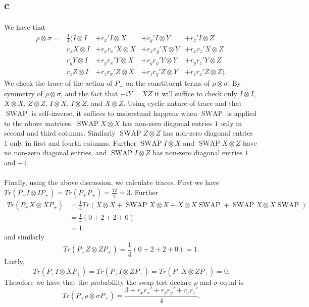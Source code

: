\documentclass[letterpaper,12pt,oneside,onecolumn]{article}
\DeclareMathOperator{\swap}{SWAP}
\begin{document}
\subsection{c}
\paragraph{}
We have that
\begin{align*}
\rho\otimes\sigma = &\frac{1}{4}(I \otimes I &+ r_x' I \otimes X &+ r_y' I \otimes Y &+ r_z' I \otimes Z \\
&r_x X\otimes I &+ r_xr_x' X\otimes X &+ r_xr_y' X\otimes Y &+ r_xr_z' X \otimes Z \\
&r_y Y \otimes I &+ r_yr_x'Y\otimes X &+ r_yr_y' Y \otimes Y &+ r_yr_z' Y \otimes Z \\
&r_z Z\otimes I &+ r_zr_x' Z\otimes X &+ r_zr_y' Z \otimes Y &+ r_zr_z' Z\otimes Z).
\end{align*}
We check the trace of the action of $P_+$ on the constituent terms of $\rho \otimes \sigma$. By symmetry of $\rho \otimes \sigma$, and the fact that $-iY = XZ$ it will suffice to check only $I\otimes I$, $X\otimes X$, $Z\otimes Z$, $I \otimes X$, $I\otimes Z$, and $X\otimes Z$. Using cyclic nature of trace and that $\swap$ is self-inverse, it suffices to understand happens when $\swap$ is applied to the above matrices. $\swap X\otimes X$ has non-zero diagonal entries $1$ only in second and third columns. Similarly $\swap Z\otimes Z$ has non-zero diagonal entries $1$ only in first and fourth columns. Further $\swap I \otimes X$ and $\swap X\otimes Z$ have no non-zero diagonal entries, and $\swap I \otimes Z$ has non-zero diagonal entries $1$ and $-1$.
\paragraph{}
Finally, using the above discussion, we calculate traces. First we have $Tr(P_+I\otimes I P_+) = Tr(P_+P_+) = \frac{12}{4} = 3$. Further
\begin{align*}
Tr(P_+ X\otimes X P_+) &= \frac{1}{4}Tr(X\otimes X + \swap X\otimes X + X\otimes X \swap + \swap X\otimes X \swap )\\
&= \frac{1}{4}(0 + 2 + 2 + 0)\\
&= 1.
\end{align*}
and similarly
$$Tr(P_+ Z \otimes Z P_+) = \frac{1}{4}(0 + 2 + 2 + 0) = 1.$$
Lastly,
$$Tr(P_+ I \otimes X P_+) = Tr(P_+ I \otimes Z P_+) = Tr(P_+ X\otimes Z P_+) = 0.$$
Therefore we have that the probability the swap test declare $\rho$ and $\sigma$ equal is
$$Tr(P_+ \rho \otimes \sigma P_+) = \frac{3 + r_xr_x' + r_yr_y' + r_zr_z'}{4}.$$
\section{}
\paragraph{}
\end{document}
